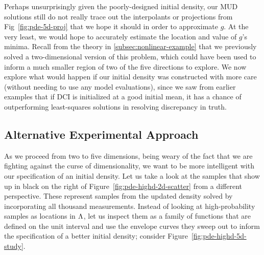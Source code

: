 Perhaps unsurprisingly given the poorly-designed initial density, our MUD solutions still do not really trace out the interpolants or projections from Fig~\ref{fig:pde-5d-proj} that we hope it should in order to approximate $g$.
At the very least, we would hope to accurately estimate the location and value of $g$'s minima.
Recall from the theory in \ref{subsec:nonlinear-example} that we previously solved a two-dimensional version of this problem, which could have been used to inform a much smaller region of two of the five directions to explore.
We now explore what would happen if our initial density was constructed with more care (without needing to use any model evaluations), since we saw from earlier examples that if DCI is initialized at a good initial mean, it has a chance of outperforming least-squares solutions in resolving discrepancy in truth.


\subsection{Alternative Experimental Approach}

As we proceed from two to five dimensions, being weary of the fact that we are fighting against the curse of dimensionality, we want to be more intelligent with our specification of an initial density.
Let us take a look at the samples that show up in black on the right of Figure~\ref{fig:pde-highd-2d-scatter} from a different perspective.
These represent samples from the updated density solved by incorporating all thousand measurements.
Instead of looking at high-probability samples as locations in ${\Lambda}$, let us inspect them as a family of functions that are defined on the unit interval and use the envelope curves they sweep out to inform the specification of a better initial density; consider Figure~\ref{fig:pde-highd-5d-study}.

